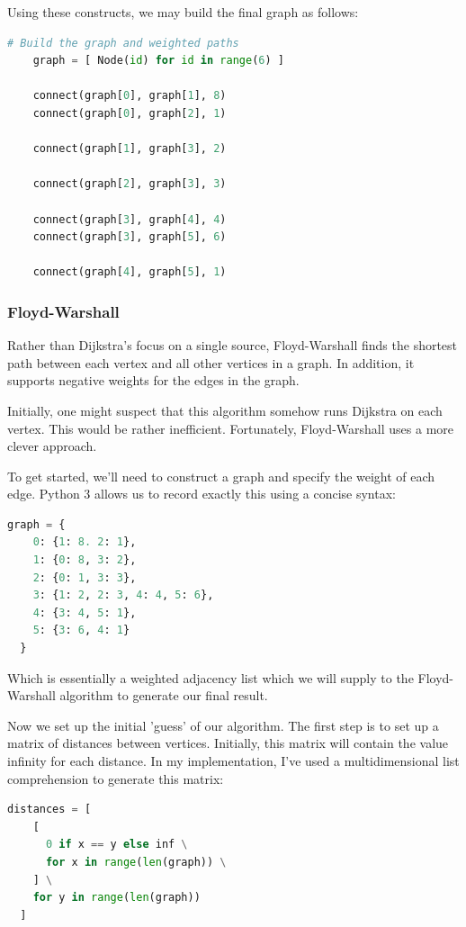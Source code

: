\documentclass{article}
\begin{document}
Using these constructs, we may build the final graph as follows:

\begin{lstlisting}[language=Python]
  # Build the graph and weighted paths
    graph = [ Node(id) for id in range(6) ]
    
    connect(graph[0], graph[1], 8)
    connect(graph[0], graph[2], 1)

    connect(graph[1], graph[3], 2)

    connect(graph[2], graph[3], 3)

    connect(graph[3], graph[4], 4)
    connect(graph[3], graph[5], 6)

    connect(graph[4], graph[5], 1)
\end{lstlisting}

\subsubsection{Floyd-Warshall}
Rather than Dijkstra's focus on a single source, Floyd-Warshall finds the shortest path between each vertex and all other vertices in a graph. In addition, it supports negative weights for the edges in the graph.

Initially, one might suspect that this algorithm somehow runs Dijkstra on each vertex.
This would be rather inefficient. Fortunately, Floyd-Warshall uses a more clever approach.

To get started, we'll need to construct a graph and specify the weight of each edge.
Python 3 allows us to record exactly this using a concise syntax:

\begin{lstlisting}[language=Python]
  graph = {
    0: {1: 8. 2: 1},
    1: {0: 8, 3: 2},
    2: {0: 1, 3: 3},
    3: {1: 2, 2: 3, 4: 4, 5: 6},
    4: {3: 4, 5: 1},
    5: {3: 6, 4: 1}
  }
\end{lstlisting}

Which is essentially a weighted adjacency list which we will supply to the Floyd-Warshall algorithm to generate our final result.

Now we set up the initial 'guess' of our algorithm.
The first step is to set up a matrix of distances between vertices.
Initially, this matrix will contain the value infinity for each distance.
In my implementation, I've used a multidimensional list comprehension to generate this matrix:

\begin{lstlisting}[language=Python]
  distances = [
    [
      0 if x == y else inf \
      for x in range(len(graph)) \
    ] \
    for y in range(len(graph))
  ]
\end{lstlisting}
\end{document}
